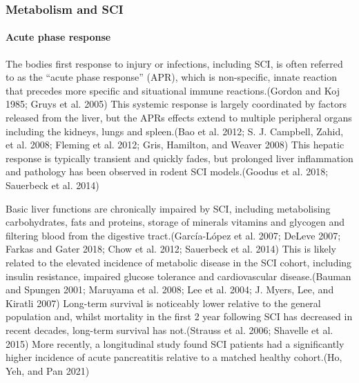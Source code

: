 \documentclass[9pt,lineno]{elife}
\begin{document}
\hypertarget{metabolism-and-sci}{%
\subsubsection{Metabolism and SCI}\label{metabolism-and-sci}}

\hypertarget{acute-phase-response}{%
\paragraph{Acute phase response}\label{acute-phase-response}}

The bodies first response to injury or infections, including SCI, is often referred to as the ``acute phase response'' (APR), which is non-specific, innate reaction that precedes more specific and situational immune reactions.(Gordon and Koj 1985; Gruys et al. 2005)
This systemic response is largely coordinated by factors released from the liver, but the APRs effects extend to multiple peripheral organs including the kidneys, lungs and spleen.(Bao et al. 2012; S. J. Campbell, Zahid, et al. 2008; Fleming et al. 2012; Gris, Hamilton, and Weaver 2008)
This hepatic response is typically transient and quickly fades, but prolonged liver inflammation and pathology has been observed in rodent SCI models.(Goodus et al. 2018; Sauerbeck et al. 2014)

Basic liver functions are chronically impaired by SCI, including metabolising carbohydrates, fats and proteins, storage of minerals vitamins and glycogen and filtering blood from the digestive tract.(García-López et al. 2007; DeLeve 2007; Farkas and Gater 2018; Chow et al. 2012; Sauerbeck et al. 2014)
This is likely related to the elevated incidence of metabolic disease in the SCI cohort, including insulin resistance, impaired glucose tolerance and cardiovascular disease.(Bauman and Spungen 2001; Maruyama et al. 2008; Lee et al. 2004; J. Myers, Lee, and Kiratli 2007)
Long-term survival is noticeably lower relative to the general population and, whilst mortality in the first 2 year following SCI has decreased in recent decades, long-term survival has not.(Strauss et al. 2006; Shavelle et al. 2015)
More recently, a longitudinal study found SCI patients had a significantly higher incidence of acute pancreatitis relative to a matched healthy cohort.(Ho, Yeh, and Pan 2021)
\end{document}
